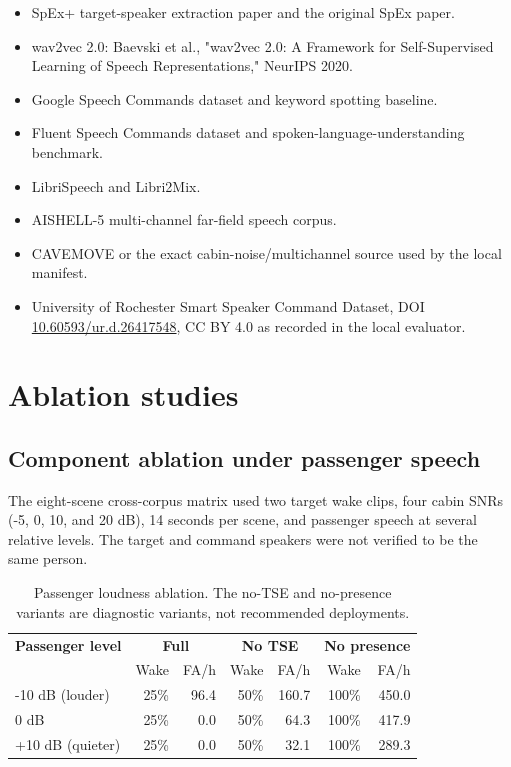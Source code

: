 \documentclass[11pt,a4paper]{article}
\begin{document}
\begin{itemize}[leftmargin=*]
  \item SpEx+ target-speaker extraction paper and the original SpEx paper.
  \item wav2vec 2.0: Baevski et al., "wav2vec 2.0: A Framework for
        Self-Supervised Learning of Speech Representations," NeurIPS 2020.
  \item Google Speech Commands dataset and keyword spotting baseline.
  \item Fluent Speech Commands dataset and spoken-language-understanding
        benchmark.
  \item LibriSpeech and Libri2Mix.
  \item AISHELL-5 multi-channel far-field speech corpus.
  \item CAVEMOVE or the exact cabin-noise/multichannel source used by the
        local manifest.
  \item University of Rochester Smart Speaker Command Dataset,
        DOI \href{https://doi.org/10.60593/ur.d.26417548}{10.60593/ur.d.26417548},
        CC BY 4.0 as recorded in the local evaluator.
\end{itemize}

\section{Ablation studies}

\subsection{Component ablation under passenger speech}

The eight-scene cross-corpus matrix used two target wake clips, four cabin
SNRs (-5, 0, 10, and 20 dB), 14 seconds per scene, and passenger speech at
several relative levels. The target and command speakers were not verified
to be the same person.

\begin{table}[H]
\centering
\caption{Passenger loudness ablation. The no-TSE and no-presence variants are
diagnostic variants, not recommended deployments.}
\label{tab:component-ablation}
\small
\begin{tabular}{@{}lrrrrrr@{}}
\toprule
\textbf{Passenger level} & \multicolumn{2}{c}{\textbf{Full}} & \multicolumn{2}{c}{\textbf{No TSE}} & \multicolumn{2}{c}{\textbf{No presence}}\\
& Wake & FA/h & Wake & FA/h & Wake & FA/h\\
\midrule
-10 dB (louder) & 25\% & 96.4 & 50\% & 160.7 & 100\% & 450.0\\
0 dB & 25\% & 0.0 & 50\% & 64.3 & 100\% & 417.9\\
+10 dB (quieter) & 25\% & 0.0 & 50\% & 32.1 & 100\% & 289.3\\
\bottomrule
\end{tabular}
\end{table}
\end{document}
